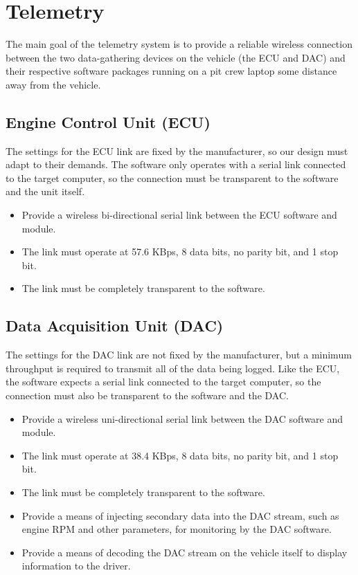 \section{Telemetry\label{sec:goals_telemetry}}

The main goal of the telemetry system is to provide a reliable wireless connection between the two data-gathering devices on the vehicle (the ECU and DAC) and their respective software packages running on a pit crew laptop some distance away from the vehicle. 

\subsection{Engine Control Unit (ECU) \label{sec:goals_telemetry_ecu}}

The settings for the ECU link are fixed by the manufacturer, so our design must adapt to their demands. The software only operates with a serial link connected to the target computer, so the connection must be transparent to the software and the unit itself.

\begin{itemize}

\item Provide a wireless bi-directional serial link between the ECU software and module.
\item The link must operate at 57.6 KBps, 8 data bits, no parity bit, and 1 stop bit.
\item The link must be completely transparent to the software.

\end{itemize}

\subsection{Data Acquisition Unit (DAC) \label{sec:goals_telemetry_dac}}

The settings for the DAC link are not fixed by the manufacturer, but a minimum throughput is required to transmit all of the data being logged. Like the ECU, the software expects a serial link connected to the target computer, so the connection must also be transparent to the software and the DAC.

\begin{itemize}

\item Provide a wireless uni-directional serial link between the DAC software and module.
\item The link must operate at 38.4 KBps, 8 data bits, no parity bit, and 1 stop bit.
\item The link must be completely transparent to the software.
\item Provide a means of injecting secondary data into the DAC stream, such as engine RPM and other parameters, for monitoring by the DAC software.
\item Provide a means of decoding the DAC stream on the vehicle itself to display information to the driver.

\end{itemize}

